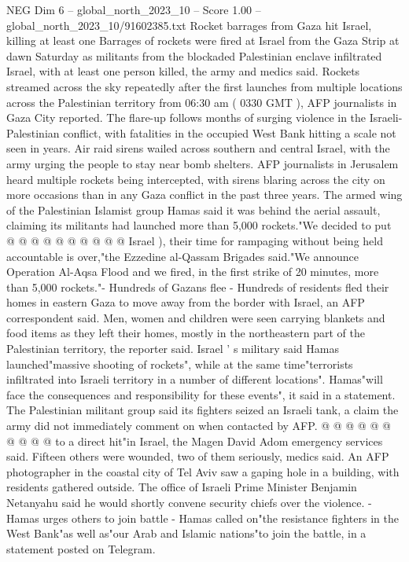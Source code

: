 \begin{textsample}{NEG Dim 6 – global\_north\_2023\_10 – Score 1.00 – global\_north\_2023\_10/91602385.txt}  \label{ex:f6_neg_201}
Rocket barrages from Gaza hit Israel, killing at least one Barrages of rockets were fired at Israel from the Gaza Strip at dawn Saturday as militants from the blockaded Palestinian enclave infiltrated Israel, with at least one person killed, the army and medics said.
Rockets streamed across the sky repeatedly after the first launches from multiple locations across the Palestinian territory from 06:30 am ( 0330 GMT ), AFP journalists in Gaza City reported.
The flare-up follows months of surging violence in the Israeli-Palestinian conflict, with fatalities in the occupied West Bank hitting a scale not seen in years.
Air raid sirens wailed across southern and central Israel, with the army urging the people to stay near bomb shelters.
AFP journalists in Jerusalem heard multiple rockets being intercepted, with sirens blaring across the city on more occasions than in any Gaza conflict in the past three years.
The armed wing of the Palestinian Islamist group Hamas said it was behind the aerial assault, claiming its militants had launched more than 5,000 rockets."We decided to put @ @ @ @ @ @ @ @ @ @ Israel ), their time for rampaging without being held accountable is over,"the Ezzedine al-Qassam Brigades said."We announce Operation Al-Aqsa Flood and we fired, in the first strike of 20 minutes, more than 5,000 rockets."- Hundreds of Gazans flee - Hundreds of residents fled their homes in eastern Gaza to move away from the border with Israel, an AFP correspondent said.
Men, women and children were seen carrying blankets and food items as they left their homes, mostly in the northeastern part of the Palestinian territory, the reporter said.
Israel ' s military said Hamas launched"massive shooting of rockets", while at the same time"terrorists infiltrated into Israeli territory in a number of different locations".
Hamas"will face the consequences and responsibility for these events", it said in a statement.
The Palestinian militant group said its fighters seized an Israeli tank, a claim the army did not immediately comment on when contacted by AFP. @ @ @ @ @ @ @ @ @ @ to a direct hit"in Israel, the Magen David Adom emergency services said.
Fifteen others were wounded, two of them seriously, medics said.
An AFP photographer in the coastal city of Tel Aviv saw a gaping hole in a building, with residents gathered outside.
The office of Israeli Prime Minister Benjamin Netanyahu said he would shortly convene security chiefs over the violence. - Hamas urges others to join battle - Hamas called on"the resistance fighters in the West Bank"as well as"our Arab and Islamic nations"to join the battle, in a statement posted on Telegram.

\end{textsample}
